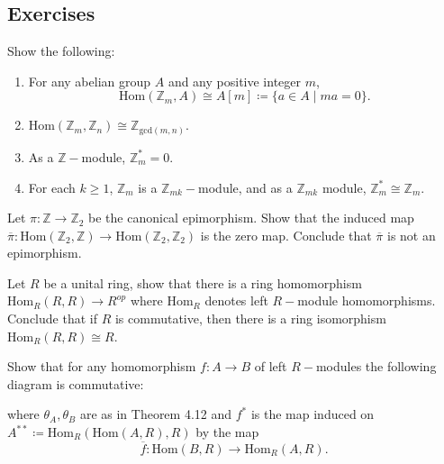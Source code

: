 \subsection{Exercises}

\begin{problem}[Hungerford 4.4.1]
Show the following:
\begin{enumerate}
    \item For any abelian group $A$ and any positive integer $m$,
    $$
    \mathrm{Hom}(\mathbb{Z}_m, A) \cong A[m] \coloneqq \{ a\in A \mid ma = 0\}.
    $$
    \item $\mathrm{Hom}(\mathbb{Z}_m, \mathbb{Z}_n) \cong \mathbb{Z}_{\mathrm{gcd}(m,n)}$.
    \item As a $\mathbb{Z}-$module, $\mathbb{Z}_m^* = 0$.
    \item For each $k\geq 1$, $\mathbb{Z}_m$ is a $\mathbb{Z}_{mk}-$module, and as a $\mathbb{Z}_{mk}$ module, $\mathbb{Z}_m^* \cong \mathbb{Z}_m$.
\end{enumerate}
\end{problem}

\begin{problem}[Hungerford 4.4.3]
Let $\pi: \mathbb{Z} \to \mathbb{Z}_2$ be the canonical epimorphism. Show that the induced map $\overline{\pi}: \mathrm{Hom}(\mathbb Z_2, \mathbb Z) \to \mathrm{Hom}(\mathbb Z_2, \mathbb Z_2)$ is the zero map. Conclude that $\overline{\pi}$ is not an epimorphism.
\end{problem}

\begin{problem}[Hungerford 4.4.5]
Let $R$ be a unital ring, show that there is a ring homomorphism $\mathrm{Hom}_R(R, R) \to R^{op}$ where $\mathrm{Hom}_R$ denotes left $R-$module homomorphisms. Conclude that if $R$ is commutative, then there is a ring isomorphism $\mathrm{Hom}_R(R, R) \cong R$.
\end{problem}

\begin{problem}[Hungerford 4.4.9]
Show that for any homomorphism $f: A \to B$ of left $R-$modules the following diagram is commutative:

\begin{center}
\end{center}

where $\theta_A, \theta_B$ are as in Theorem 4.12 and $f^*$ is the map induced on $A^{**} \coloneqq \mathrm{Hom}_R(\mathrm{Hom}(A, R), R)$ by the map $$\overline f: \mathrm{Hom}(B, R) \to \mathrm{Hom}_R(A, R).$$
\end{problem}


